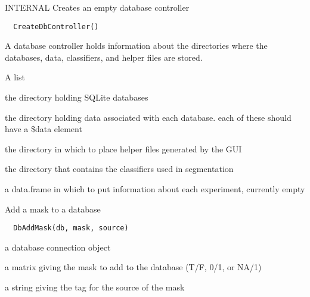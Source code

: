 \documentclass[a4paper]{book}
\begin{document}
%
\begin{Description}\relax
INTERNAL Creates an empty database controller
\end{Description}
%
\begin{Usage}
\begin{verbatim}
  CreateDbController()
\end{verbatim}
\end{Usage}
%
\begin{Details}\relax
A database controller holds information about the
directories where the databases, data, classifiers, and
helper files are stored. \\{}
\end{Details}
%
\begin{Value}
A list \begin{ldescription}
\item[\code{db.directory}] the directory holding SQLite
databases\item[\code{data.directory}] the directory holding
data associated with each database.  each of these should
have a \bsl{}\$data element\item[\code{helper.directory}] the
directory in which to place helper files generated by the
GUI\item[\code{classifier.direcoty}] the directory that
contains the classifiers used in segmentation
\item[\code{expdf}] a data.frame in which to put information
about each experiment, currently empty
\end{ldescription}
\end{Value}
%
\begin{Description}\relax
Add a mask to a database
\end{Description}
%
\begin{Usage}
\begin{verbatim}
  DbAddMask(db, mask, source)
\end{verbatim}
\end{Usage}
%
\begin{Arguments}
\begin{ldescription}
\item[\code{db}] a database connection object

\item[\code{mask}] a matrix giving the mask to add to the
database (T/F, 0/1, or NA/1)

\item[\code{source}] a string giving the tag for the source of
the mask
\end{ldescription}
\end{Arguments}
\end{document}
